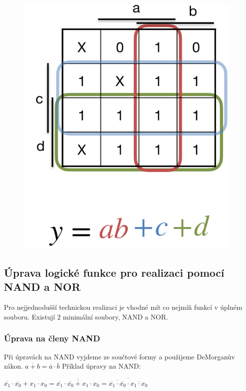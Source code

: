 \begin{figure}
    \centering
    \includegraphics[scale = 0.3]{img/minMapa.png}
\end{figure}

\subsection{Úprava logické funkce pro realizaci pomocí NAND a NOR}
Pro nejjednodušší technickou realizaci je vhodné mít co nejmíň funkcí v úplném souboru. Existují 2 minimální soubory, NAND a NOR.
\subsubsection{Úprava na členy NAND}
Při úpravách na NAND vyjdeme ze součtové formy a použijeme DeMorganův zákon. \(\overline{a+b} = \overline{a} \cdot \overline{b}\)
Příklad úpravy na NAND:
\begin{center}
    \(\overline{x_1} \cdot \overline{x_0} + x_1 \cdot x_0 = \overline{\overline{\overline{x_1}\cdot\overline{x_0} + x_1 \cdot x_0}} = \overline{\overline{\overline{x_1}\cdot \overline{x_0}}\cdot\overline{x_1 \cdot x_0}}\)
\end{center}
